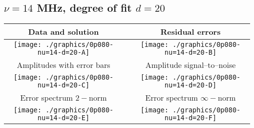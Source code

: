 

% 

\clearpage{}
\break{}

\subsection{$\nu = 14$ MHz, degree of fit $d = 20$}

\begin{table}[h]
    \begin{center}
        \begin{tabular}{ccc}
            Data and solution & \quad & Residual errors \\\hline
            \texttt{[image: ./graphics/0p080-nu=14-d=20-A]} &&
            \texttt{[image: ./graphics/0p080-nu=14-d=20-B]} \\[15pt]
            Amplitudes with error bars && Amplitude signal--to--noise \\\hline
            \texttt{[image: ./graphics/0p080-nu=14-d=20-C]} &&
            \texttt{[image: ./graphics/0p080-nu=14-d=20-D]} \\[15pt]
            Error spectrum $2-$norm && Error spectrum $\infty-$norm \\\hline
            \texttt{[image: ./graphics/0p080-nu=14-d=20-E]} &&
            \texttt{[image: ./graphics/0p080-nu=14-d=20-F]} \\[15pt]
        \end{tabular}
    \end{center}
\label{fig:elev=80, nu=14}
\end{table}



\endinput
